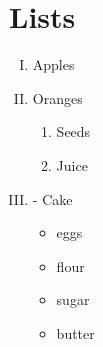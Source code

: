 \documentclass{article}
\begin{document}
\section{Lists}
\begin{enumerate}[I.] 
    \item Apples
    \item Oranges
    \begin {enumerate} 
        \item Seeds
        \item Juice
    \end{enumerate}
    \item [-]Cake
    \begin{itemize}
    \item eggs
    \item flour
    \item sugar
    \item butter
    \end{itemize}
\end{enumerate}
\end{document}
